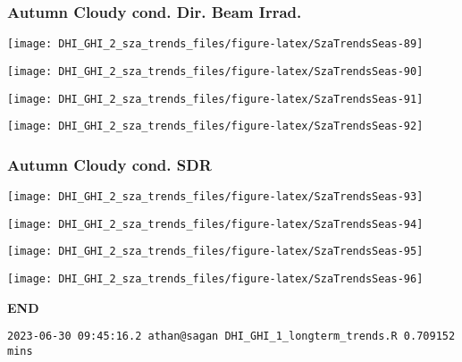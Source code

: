 \documentclass[
  10pt,
  a4paper,oneside]{article}
\begin{document}
\newpage

\hypertarget{autumn-cloudy-cond.-dir.-beam-irrad.}{%
\subsubsection{Autumn Cloudy cond. Dir. Beam Irrad.}\label{autumn-cloudy-cond.-dir.-beam-irrad.}}

\begin{center}\texttt{[image: DHI\_GHI\_2\_sza\_trends\_files/figure-latex/SzaTrendsSeas-89]} \end{center}

\begin{center}\texttt{[image: DHI\_GHI\_2\_sza\_trends\_files/figure-latex/SzaTrendsSeas-90]} \end{center}

\begin{center}\texttt{[image: DHI\_GHI\_2\_sza\_trends\_files/figure-latex/SzaTrendsSeas-91]} \end{center}

\begin{center}\texttt{[image: DHI\_GHI\_2\_sza\_trends\_files/figure-latex/SzaTrendsSeas-92]} \end{center}

\newpage

\hypertarget{autumn-cloudy-cond.-sdr}{%
\subsubsection{Autumn Cloudy cond. SDR}\label{autumn-cloudy-cond.-sdr}}

\begin{center}\texttt{[image: DHI\_GHI\_2\_sza\_trends\_files/figure-latex/SzaTrendsSeas-93]} \end{center}

\begin{center}\texttt{[image: DHI\_GHI\_2\_sza\_trends\_files/figure-latex/SzaTrendsSeas-94]} \end{center}

\begin{center}\texttt{[image: DHI\_GHI\_2\_sza\_trends\_files/figure-latex/SzaTrendsSeas-95]} \end{center}

\begin{center}\texttt{[image: DHI\_GHI\_2\_sza\_trends\_files/figure-latex/SzaTrendsSeas-96]} \end{center}

\textbf{END}

\begin{verbatim}
2023-06-30 09:45:16.2 athan@sagan DHI_GHI_1_longterm_trends.R 0.709152 mins
\end{verbatim}
\end{document}
